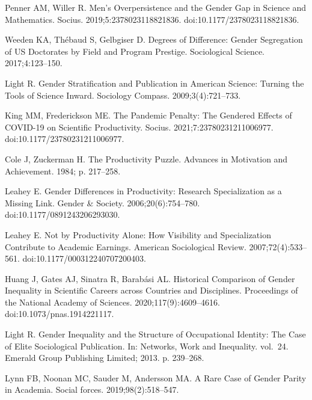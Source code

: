 \documentclass[
  10pt,
  letterpaper,
]{article}
\begin{document}
\begin{thebibliography}{10}
Penner AM, Willer R.
\newblock Men's {{Overpersistence}} and the {{Gender Gap}} in {{Science}} and {{Mathematics}}.
\newblock Socius. 2019;5:2378023118821836.
\newblock doi:{10.1177/2378023118821836}.

Weeden KA, Th{\'e}baud S, Gelbgiser D.
\newblock Degrees of Difference: {{Gender}} Segregation of {{US}} Doctorates by Field and Program Prestige.
\newblock Sociological Science. 2017;4:123--150.

Light R.
\newblock Gender Stratification and Publication in {{American}} Science: {{Turning}} the Tools of Science Inward.
\newblock Sociology Compass. 2009;3(4):721--733.

King MM, Frederickson ME.
\newblock The {{Pandemic Penalty}}: {{The Gendered Effects}} of {{COVID-19}} on {{Scientific Productivity}}.
\newblock Socius. 2021;7:23780231211006977.
\newblock doi:{10.1177/23780231211006977}.

Cole J, Zuckerman H.
\newblock The {{Productivity Puzzle}}.
\newblock Advances in Motivation and Achievement. 1984; p. 217--258.

Leahey E.
\newblock Gender {{Differences}} in {{Productivity}}: {{Research Specialization}} as a {{Missing Link}}.
\newblock Gender \& Society. 2006;20(6):754--780.
\newblock doi:{10.1177/0891243206293030}.

Leahey E.
\newblock Not by {{Productivity Alone}}: {{How Visibility}} and {{Specialization Contribute}} to {{Academic Earnings}}.
\newblock American Sociological Review. 2007;72(4):533--561.
\newblock doi:{10.1177/000312240707200403}.

Huang J, Gates AJ, Sinatra R, Barab{\'a}si AL.
\newblock Historical Comparison of Gender Inequality in Scientific Careers across Countries and Disciplines.
\newblock Proceedings of the National Academy of Sciences. 2020;117(9):4609--4616.
\newblock doi:{10.1073/pnas.1914221117}.

Light R.
\newblock Gender Inequality and the Structure of Occupational Identity: {{The}} Case of Elite Sociological Publication.
\newblock In: Networks, Work and Inequality. vol.~24. Emerald Group Publishing Limited; 2013. p. 239--268.

Lynn FB, Noonan MC, Sauder M, Andersson MA.
\newblock A Rare Case of Gender Parity in Academia.
\newblock Social forces. 2019;98(2):518--547.


\end{thebibliography}
\end{document}
